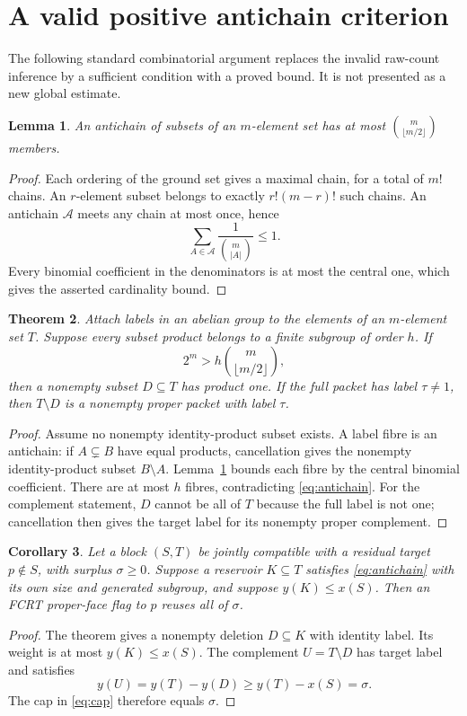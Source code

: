 \documentclass[11pt,a4paper]{article}
\newtheorem{theorem}{Theorem}[section]
\newtheorem{lemma}[theorem]{Lemma}
\newtheorem{corollary}[theorem]{Corollary}
\theoremstyle{definition}
\theoremstyle{remark}
\begin{document}
\section{A valid positive antichain criterion}
The following standard combinatorial argument replaces the invalid raw-count
inference by a sufficient condition with a proved bound. It is not presented
as a new global estimate.

\begin{lemma}\label{lem:sperner}
An antichain of subsets of an $m$-element set has at most
$\binom{m}{\lfloor m/2\rfloor}$ members.
\end{lemma}
\begin{proof}
Each ordering of the ground set gives a maximal chain, for a total of $m!$
chains. An $r$-element subset belongs to exactly $r!(m-r)!$ such chains.
An antichain $\mathcal A$ meets any chain at most once, hence
\[
 \sum_{A\in\mathcal A}\frac{1}{\binom m{|A|}}\le1.
\]
Every binomial coefficient in the denominators is at most the central one,
which gives the asserted cardinality bound.
\end{proof}

\begin{theorem}\label{thm:antichain}
Attach labels in an abelian group to the elements of an $m$-element set $T$.
Suppose every subset product belongs to a finite subgroup of order $h$. If
\begin{equation}\label{eq:antichain}
 2^m>h\binom m{\lfloor m/2\rfloor},
\end{equation}
then a nonempty subset $D\subseteq T$ has product one. If the full packet
has label $\tau\ne1$, then $T\setminus D$ is a nonempty proper packet with
label $\tau$.
\end{theorem}
\begin{proof}
Assume no nonempty identity-product subset exists. A label fibre is an
antichain: if $A\subsetneq B$ have equal products, cancellation gives the
nonempty identity-product subset $B\setminus A$. Lemma~\ref{lem:sperner}
bounds each fibre by the central binomial coefficient. There are at most
$h$ fibres, contradicting \eqref{eq:antichain}. For the complement statement,
$D$ cannot be all of $T$ because the full label is not one; cancellation
then gives the target label for its nonempty proper complement.
\end{proof}

\begin{corollary}\label{cor:weighted}
Let a block $(S,T)$ be jointly compatible with a residual target $p\notin S$, with surplus
$\sigma\ge0$. Suppose a reservoir $K\subseteq T$ satisfies
\eqref{eq:antichain} with its own size and generated subgroup, and suppose
$y(K)\le x(S)$. Then an FCRT proper-face flag to $p$ reuses all of $\sigma$.
\end{corollary}
\begin{proof}
The theorem gives a nonempty deletion $D\subseteq K$ with identity label.
Its weight is at most $y(K)\le x(S)$. The complement $U=T\setminus D$
has target label and satisfies
\[
 y(U)=y(T)-y(D)\ge y(T)-x(S)=\sigma.
\]
The cap in \eqref{eq:cap} therefore equals $\sigma$.
\end{proof}
\end{document}
